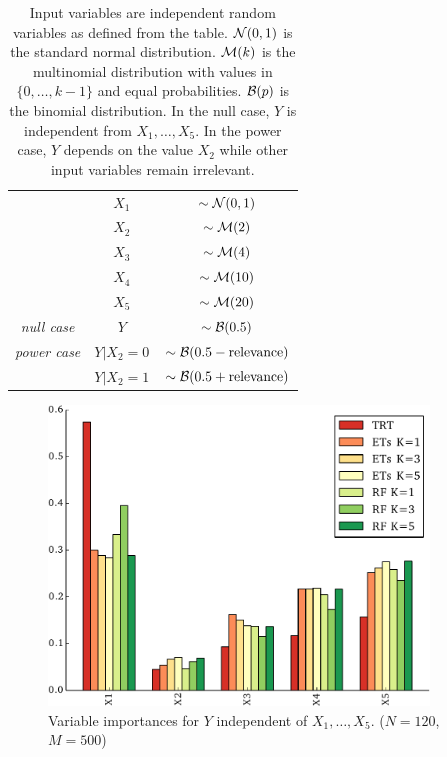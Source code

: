 \begin{table}
    \centering
    \begin{tabular}{| c c c |}
    \hline
    & $X_1$ & $\sim{\cal N}(0, 1)$ \\
    & $X_2$ & $\sim{\cal M}(2)$ \\
    & $X_3$ & $\sim{\cal M}(4)$ \\
    & $X_4$ & $\sim{\cal M}(10)$ \\
    & $X_5$ & $\sim{\cal M}(20)$ \\
    \hline
    \hline
    {\it null case}  & $Y$ & $\sim{\cal B}(0.5)$ \\
    {\it power case} & $Y|X_2=0$ &  $\sim{\cal B}(0.5-\text{relevance})$ \\
                     & $Y|X_2=1$ &  $\sim{\cal B}(0.5+\text{relevance})$ \\
    \hline
    \end{tabular}
    \caption{Input variables are independent random variables as defined from
    the table. ${\cal N}(0, 1)$ is the standard normal
    distribution. ${\cal M}(k)$ is the multinomial distribution with values in $\{0, \dots, k-1\}$
    and equal probabilities. ${\cal B}(p)$ is the binomial distribution. In the
    null case, $Y$ is independent from $X_1, \dots, X_5$. In the power case, $Y$
    depends on the value $X_2$ while other input variables remain irrelevant.}
    \label{table:simulation}
\end{table}

\begin{figure}
\centering
\includegraphics[width=0.9\textwidth]{figures/ch7_bias_null.pdf}
\caption{Variable importances for $Y$ independent of $X_1, \dots, X_5$. ($N=120$, $M=500$)}
\label{fig:7:bias:null}
\end{figure}


